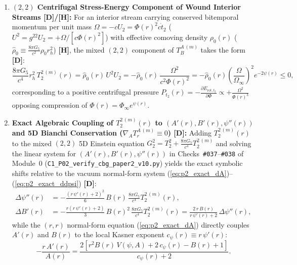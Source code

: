 \documentclass[11pt,a4paper]{article}
\newcommand{\catD}{\textbf{\textcolor{blue!75!black}{[D]}}}
\newcommand{\catH}{\textbf{\textcolor{orange!85!black}{[H]}}}
\theoremstyle{plain}
\theoremstyle{definition}
\theoremstyle{remark}
\numberwithin{equation}{section}
\begin{document}
\begin{enumerate}
    \item \textbf{$(2,2)$ Centrifugal Stress-Energy Component of Wound Interior Streams \catD/\catH:} For an interior stream carrying conserved bitemporal momentum per unit mass $\Omega = -c U_2 = \Phi(r)^2 c\dot{t}_2$ ($U^2 = g^{22}U_2 = +\Omega/[c\Phi(r)^2]$) with effective comoving density $\rho_0(r)$ ($\hat{\rho}_0 \equiv \frac{8\pi G_5}{c^2}\rho_0 r_h^2$) \catH, the mixed $(2,2)$ component of $T^{A\,(m)}_B$ takes the form \catD:
    \begin{equation}
      \frac{8\pi G_5}{c^4}r_h^2\,T^{2\,(m)}_2(r) = \hat{\rho}_0(r)\,U^2 U_2 = -\hat{\rho}_0(r)\,\frac{\Omega^2}{c^2\Phi(r)^2} = -\hat{\rho}_0(r)\left(\frac{\Omega}{\Omega_{\infty}}\right)^{\!2} e^{-2\psi(r)} \le 0,
      \label{eq:transverse_volume_rate}
    \end{equation}
    corresponding to a positive centrifugal pressure $P_{t_2}(r) = -\frac{\partial E_{\text{rot},t_2}}{\partial\Phi} \propto +\frac{\Omega^2}{\Phi(r)^3}$ opposing compression of $\Phi(r) = \Phi_{\infty}e^{\psi(r)}$.
    \item \textbf{Exact Algebraic Coupling of $T^{2\,(m)}_2(r)$ to $(A'(r), B'(r), \psi''(r))$ and 5D Bianchi Conservation ($\nabla_A T^{A\,(m)}_r \equiv 0$) \catD:} Adding $T^{2\,(m)}_2(r)$ to the mixed $(2,2)$ 5D Einstein equation $G^2_2 = T^2_2 + \frac{8\pi G_5}{c^4}T^{2\,(m)}_2$ and solving the linear system for $(A'(r), B'(r), \psi''(r))$ in Checks~\texttt{\#037}--\texttt{\#038} of Module~0 (\allowbreak\texttt{C1\_P02\_verify\_cbg\_paper2\_v10.py}) yields the exact symbolic shifts relative to the vacuum normal-form system (\ref{eq:p2_exact_dA})--(\ref{eq:p2_exact_ddpsi}) \catD:
    \begin{align}
      \Delta\psi''(r) &= -\frac{\left(r\,\psi'(r) + 2\right)^2}{6}\,B(r)\,\frac{8\pi G_5}{c^4}T^{2\,(m)}_2(r), \nonumber \\[3pt]
      \Delta B'(r) &= -\frac{r\left(r\,\psi'(r) + 2\right)}{3}\,B(r)^2\,\frac{8\pi G_5}{c^4}T^{2\,(m)}_2(r) = \frac{2\,r\,B(r)}{r\,\psi'(r) + 2}\,\Delta\psi''(r),
      \label{eq:symbolic_T22_shifts}
    \end{align}
    while the $(r,r)$ normal-form equation (\ref{eq:p2_exact_dA}) directly couples $A'(r)$ and $B(r)$ to the local Kasner exponent $c_{\psi}(r) \equiv r\,\psi'(r)$:
    \begin{equation}
      -\frac{r\,A'(r)}{A(r)} = \frac{2\left[r^2 B(r)\,V(\psi,A) + 2\,c_{\psi}(r) - B(r) + 1\right]}{c_{\psi}(r) + 2}.
      \label{eq:kasner_A_B_suppression_law}

\end{equation}
\end{enumerate}
\end{document}
